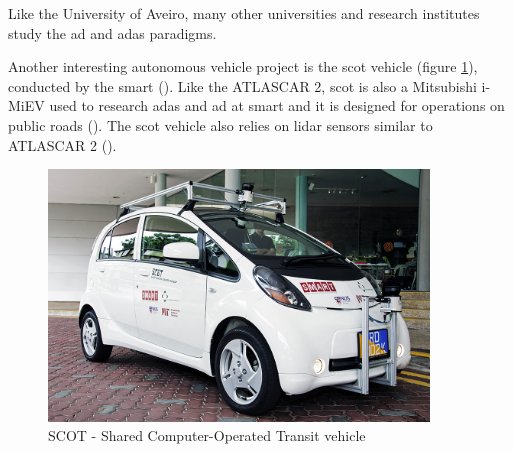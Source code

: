 Like the University of Aveiro, many other universities and research institutes study the \gls{ad} and \gls{adas} paradigms.

Another interesting autonomous vehicle project is the \gls{scot} vehicle (figure \ref{fig:scot}), conducted by the \gls{smart} (\cite{Singapore-MITAllianceforResearchandTechnology}). Like the ATLASCAR 2, \gls{scot} is also a Mitsubishi i-MiEV used to research \gls{adas} and \gls{ad} at \gls{smart} and it is designed for operations on public roads (\cite{AndreasHerrmannWalterBrenner2018}). The \gls{scot} vehicle also relies on \gls{lidar} sensors similar to ATLASCAR 2 (\cite{Teo}). 

\begin{figure}[htp]
	
	\centering
	\includegraphics[width=0.9\textwidth]{capstate/imgs/scot}
	
	\caption{SCOT - Shared Computer-Operated Transit vehicle}
	\label{fig:scot}
	
\end{figure}

